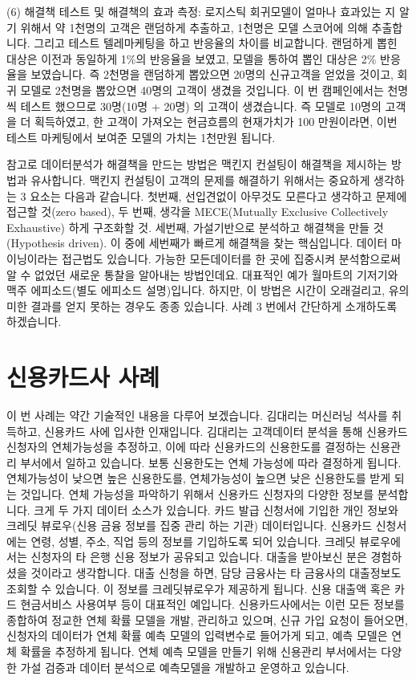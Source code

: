 \documentclass[letterpaper,10pt,english]{jupyterBook}
\begin{document}
\sphinxAtStartPar
(6) 해결책 테스트 및 해결책의 효과 측정: 로지스틱 회귀모델이 얼마나 효과있는 지 알기 위해서 약 1천명의 고객은 랜덤하게 추출하고, 1천명은 모델 스코어에 의해 추출합니다. 그리고 테스트 텔레마케팅을 하고 반응율의 차이를 비교합니다. 랜덤하게 뽑힌 대상은 이전과 동일하게 1\%의 반응율을 보였고, 모델을 통하여 뽑인 대상은 2\% 반응율을 보였습니다. 즉 2천명을 랜덤하게 뽑았으면 20명의 신규고객을 얻었을 것이고, 회귀 모델로 2천명을 뽑았으면 40명의 고객이 생겼을 것입니다. 이 번 캠페인에서는 천명씩 테스트 했으므로 30명(10명 + 20명) 의 고객이 생겼습니다. 즉 모델로 10명의 고객을 더 획득하였고, 한 고객이 가져오는 현금흐름의 현재가치가 100 만원이라면, 이번 테스트 마케팅에서 보여준 모델의 가치는 1천만원 됩니다.

\sphinxAtStartPar
참고로 데이터분석가 해결책을 만드는 방법은 맥킨지 컨설팅이 해결책을 제시하는 방법과 유사합니다. 맥킨지 컨설팅이 고객의 문제를 해결하기 위해서는 중요하게 생각하는 3 요소는 다음과 같습니다. 첫번째, 선입견없이 아무것도 모른다고 생각하고 문제에 접근할 것(zero based), 두 번째, 생각을 MECE(Mutually Exclusive Collectively Exhaustive) 하게 구조화할 것. 세번째, 가설기반으로 분석하고 해결책을 만들 것(Hypothesis driven). 이 중에 세번째가 빠르게 해결책을 찾는 핵심입니다. 데이터 마이닝이라는 접근법도 있습니다. 가능한 모든데이터를 한 곳에 집중시켜 분석함으로써 알 수 없었던 새로운 통찰을 알아내는 방법인데요. 대표적인 예가 월마트의 기저기와 맥주 에피소드(별도 에피소드 설명)입니다. 하지만, 이 방법은 시간이 오래걸리고, 유의미한 결과를 얻지 못하는 경우도 종종 있습니다. 사례 3 번에서 간단하게 소개하도록 하겠습니다.


\section{신용카드사 사례}
\label{\detokenize{chapter3/3.1.2_Use_Case:id1}}\label{\detokenize{chapter3/3.1.2_Use_Case::doc}}
\sphinxAtStartPar
이 번 사례는 약간 기술적인 내용을 다루어 보겠습니다. 김대리는 머신러닝 석사를 취득하고, 신용카드 사에 입사한 인재입니다. 김대리는 고객데이터 분석을 통해 신용카드 신청자의 연체가능성을 추정하고, 이에 따라 신용카드의 신용한도를 결정하는 신용관리 부서에서 일하고 있습니다. 보통 신용한도는 연체 가능성에 따라 결정하게 됩니다. 연체가능성이 낮으면 높은 신용한도를, 연체가능성이 높으면 낮은 신용한도를 받게 되는 것입니다. 연체 가능성을 파악하기 위해서 신용카드 신청자의 다양한 정보를 분석합니다. 크게 두 가지 데이터 소스가 있습니다. 카드 발급 신청서에 기입한 개인 정보와 크레딧 뷰로우(신용 금융 정보를 집중 관리 하는 기관) 데이터입니다. 신용카드 신청서에는 연령, 성별, 주소, 직업 등의 정보를 기입하도록 되어 있습니다. 크레딧 뷰로우에서는 신청자의 타 은행 신용 정보가 공유되고 있습니다. 대출을 받아보신 분은 경험하셨을 것이라고 생각합니다. 대출 신청을 하면, 담당 금융사는 타 금융사의 대출정보도 조회할 수 있습니다. 이 정보를 크레딧뷰로우가 제공하게 됩니다. 신용 대출액 혹은 카드 현금서비스 사용여부 등이 대표적인 예입니다. 신용카드사에서는 이런 모든 정보를 종합하여 정교한 연체 확률 모델을 개발, 관리하고 있으며, 신규 가입 요청이 들어오면, 신청자의 데이터가 연체 확률 예측 모델의 입력변수로 들어가게 되고, 예측 모델은 연체 확률을 추정하게 됩니다. 연체 예측 모델을 만들기 위해 신용관리 부서에서는 다양한 가설 검증과 데이터 분석으로 예측모델을 개발하고 운영하고 있습니다.
\end{document}
